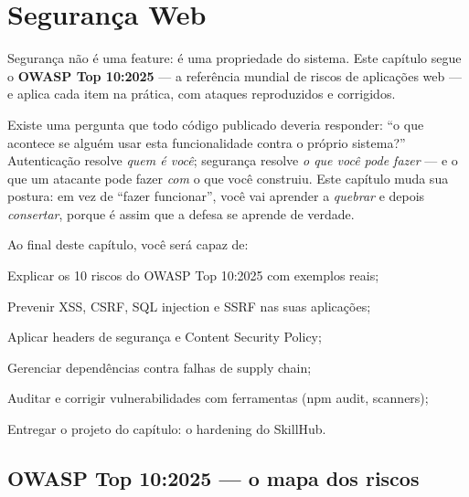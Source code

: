 \chapter{Segurança Web}
\label{cap:seguranca}

\begin{caixaconceito}
Segurança não é uma feature: é uma propriedade do sistema. Este capítulo segue
o \textbf{OWASP Top 10:2025} \cite{owasp2025} — a referência mundial de riscos
de aplicações web — e aplica cada item na prática, com ataques reproduzidos e
corrigidos.
\end{caixaconceito}

Existe uma pergunta que todo código publicado deveria responder: ``o que
acontece se alguém usar esta funcionalidade contra o próprio sistema?''
Autenticação resolve \emph{quem é você}; segurança resolve \emph{o que você
pode fazer} — e o que um atacante pode fazer \emph{com} o que você construiu.
Este capítulo muda sua postura: em vez de ``fazer funcionar'', você vai
aprender a \emph{quebrar} e depois \emph{consertar}, porque é assim que a
defesa se aprende de verdade.

Ao final deste capítulo, você será capaz de:
\begin{objetivos}
  \item Explicar os 10 riscos do OWASP Top 10:2025 com exemplos reais;
  \item Prevenir XSS, CSRF, SQL injection e SSRF nas suas aplicações;
  \item Aplicar headers de segurança e Content Security Policy;
  \item Gerenciar dependências contra falhas de supply chain;
  \item Auditar e corrigir vulnerabilidades com ferramentas (npm audit, scanners);
  \item Entregar o projeto do capítulo: o hardening do SkillHub.
\end{objetivos}

\section{OWASP Top 10:2025 — o mapa dos riscos}

